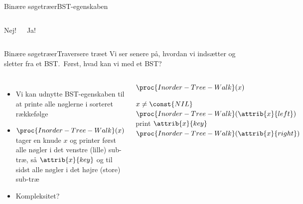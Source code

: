 \documentclass[aspectratio=1610]{beamer}
\begin{document}
\begin{frame}{Binære søgetræer}{BST-egenskaben}
\begin{columns}
        \pause
        Nej!

        \centering

        \pause


        \pause
        Ja!
    \end{columns}
\end{frame}


\begin{frame}{Binære søgetræer}{Traversere træet}
    Vi ser senere på, hvordan vi indsætter og sletter fra et BST.\ Først, hvad
    kan vi med et BST?

    \begin{columns}
        \begin{itemize}
            \item<1-> Vi kan udnytte BST-egenskaben til at printe alle nøglerne i
                sorteret rækkefølge
            \item<2-> $\proc{Inorder-Tree-Walk}(x)$ tager en knude $x$ og
                printer først alle nøgler i det venstre (lille) sub-træ, så
                $\attrib{x}{key}$ og til sidst alle nøgler i det højre (store)
                sub-træ
            \item<3-> Kompleksitet? 
        \end{itemize}
    
        \begin{block}{$\proc{Inorder-Tree-Walk}(x)$}
            \small

            \vspace{-\abovedisplayskip}
            \begin{codebox}
                \li \If $x \neq \const{NIL}$
                \li \Then
                        $\proc{Inorder-Tree-Walk}(\attrib{x}{left})$
                \li     print $\attrib{x}{key}$ 
                \li     $\proc{Inorder-Tree-Walk}(\attrib{x}{right})$
                    \End
            \end{codebox}
        \end{block}
        \centering
        \vfill
    \end{columns}
\end{frame}
\end{document}
